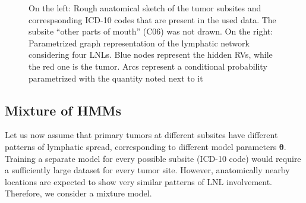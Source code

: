 \documentclass[11pt,twocolumn,twoside]{article}
\begin{document}
\begin{figure}[th]


\caption{\label{fig-schematic-and-graph}On the left: Rough anatomical
sketch of the tumor subsites and correspsonding ICD-10 codes that are
present in the used data. The subsite ``other parts of mouth'' (C06) was
not drawn. On the right: Parametrized graph representation of the
lymphatic network considering four LNLs. Blue nodes represent the hidden
RVs, while the red one is the tumor. Arcs represent a conditional
probability parametrized with the quantity noted next to it}

\end{figure}%

\subsection{Mixture of HMMs}\label{sec-mixture-of-hmms}

Let us now assume that primary tumors at different subsites have
different patterns of lymphatic spread, corresponding to different model
parameters \(\boldsymbol{\theta}\). Training a separate model for every
possible subsite (ICD-10 code) would require a sufficiently large
dataset for every tumor site. However, anatomically nearby locations are
expected to show very similar patterns of LNL involvement. Therefore, we
consider a mixture model.
\end{document}
